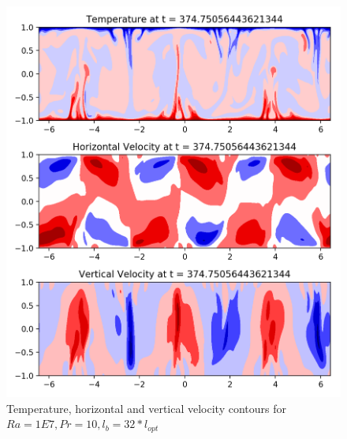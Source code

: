 \documentclass[12pt]{article}
\begin{document}
       \begin{figure}[!htb]
       	\includegraphics[width=\linewidth]{contours_1E7_10_32.png}
       	\caption{Temperature, horizontal and vertical velocity contours for $Ra = 1E7, Pr =10, l_b = 32* l_{opt} $ }
       	\label{fig:fig23}
       \end{figure}
       
\end{document}
